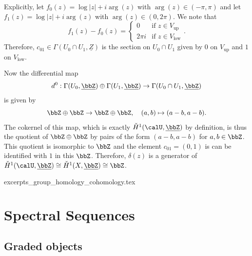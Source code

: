 \begin{example}
    Explicitly, let $f_0(z) = \log |z| + i \arg(z)$ with $\arg(z) \in (-\pi, \pi)$ and let $f_1(z) = \log |z| + i \arg(z)$ with $\arg(z) \in (0, 2 \pi)$. We note that 
    $$f_1(z) - f_0(z) = \begin{cases} 0 &\text{if } z \in V_{\text{up}} \\ 2\pi i &\text{if } z \in V_{\text{low}} \end{cases}.$$
    Therefore, $c_{01} \in \Gamma(U_0 \cap U_1, \underline{Z})$ is the section on $U_0 \cap U_1$ given by $0$ on $V_{\text{up}}$ and $1$ on $V_{\text{low}}$. 

    Now the differential map 
    $$d^0: \Gamma(U_0, \underline{\bbZ}) \oplus \Gamma(U_1, \underline{\bbZ}) \to \Gamma(U_0 \cap U_1, \underline{\bbZ})$$
    is given by
    $$\bbZ \oplus \bbZ \to \bbZ \oplus \bbZ, \quad (a,b) \mapsto (a-b, a-b).$$
    The cokernel of this map, which is exactly $\check{H}^1(\calU, \underline{\bbZ})$ by definition, is thus the quotient of $\bbZ \oplus \bbZ$ by pairs of the form $(a-b, a-b)$ for $a,b \in \bbZ$. This quotient is isomorphic to $\bbZ$ and the element $c_{01} = (0,1)$ is can be identified with $1$ in this $\bbZ$. Therefore, $\delta(z)$ is a generator of $\check{H}^1(\calU, \underline{\bbZ}) \cong \check{H}^1(X, \underline{\bbZ}) \cong \bbZ$.
    
\end{example}


{excerpts_group_homology_cohomology.tex}

\section{Spectral Sequences}

\subsection{Graded objects}











